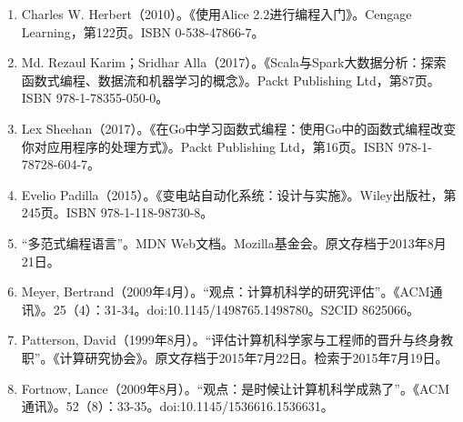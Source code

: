 \begin{enumerate}
\item Charles W. Herbert（2010）。《使用Alice 2.2进行编程入门》。Cengage Learning，第122页。ISBN 0-538-47866-7。  
\item Md. Rezaul Karim；Sridhar Alla（2017）。《Scala与Spark大数据分析：探索函数式编程、数据流和机器学习的概念》。Packt Publishing Ltd，第87页。ISBN 978-1-78355-050-0。  
\item Lex Sheehan（2017）。《在Go中学习函数式编程：使用Go中的函数式编程改变你对应用程序的处理方式》。Packt Publishing Ltd，第16页。ISBN 978-1-78728-604-7。  
\item Evelio Padilla（2015）。《变电站自动化系统：设计与实施》。Wiley出版社，第245页。ISBN 978-1-118-98730-8。  
\item “多范式编程语言”。MDN Web文档。Mozilla基金会。原文存档于2013年8月21日。  
\item Meyer, Bertrand（2009年4月）。“观点：计算机科学的研究评估”。《ACM通讯》。25（4）：31-34。doi:10.1145/1498765.1498780。S2CID 8625066。  
\item Patterson, David（1999年8月）。“评估计算机科学家与工程师的晋升与终身教职”。《计算研究协会》。原文存档于2015年7月22日。检索于2015年7月19日。  
\item Fortnow, Lance（2009年8月）。“观点：是时候让计算机科学成熟了”。《ACM通讯》。52（8）：33-35。doi:10.1145/1536616.1536631。
\end{enumerate}
